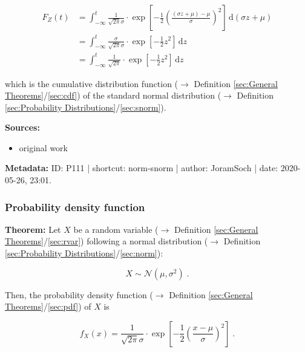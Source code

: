 \documentclass[a4paper,12pt,twoside]{book}
\begin{document}
\begin{equation} \label{eq:norm-snorm-snorm-cdf}
\begin{split}
F_Z(t) &= \int_{-\infty}^{t} \frac{1}{\sqrt{2 \pi} \sigma} \cdot \exp \left[ -\frac{1}{2} \left( \frac{(\sigma z + \mu)-\mu}{\sigma} \right)^2 \right] \, \mathrm{d}(\sigma z + \mu) \\
&= \int_{-\infty}^{t} \frac{\sigma}{\sqrt{2 \pi} \sigma} \cdot \exp \left[ -\frac{1}{2} z^2 \right] \, \mathrm{d}z \\
&= \int_{-\infty}^{t} \frac{1}{\sqrt{2 \pi}} \cdot \exp \left[ -\frac{1}{2} z^2 \right] \, \mathrm{d}z
\end{split}
\end{equation}

which is the cumulative distribution function ($\rightarrow$ Definition \ref{sec:General Theorems}/\ref{sec:cdf}) of the standard normal distribution ($\rightarrow$ Definition \ref{sec:Probability Distributions}/\ref{sec:snorm}).


\vspace{1em}
\textbf{Sources:}
\begin{itemize}
\item original work\end{itemize}


\vspace{1em}
\textbf{Metadata:} ID: P111 | shortcut: norm-snorm | author: JoramSoch | date: 2020-05-26, 23:01.
\vspace{1em}



\subsubsection[\textbf{Probability density function}]{Probability density function} \label{sec:norm-pdf}
\setcounter{equation}{0}

\textbf{Theorem:} Let $X$ be a random variable ($\rightarrow$ Definition \ref{sec:General Theorems}/\ref{sec:rvar}) following a normal distribution ($\rightarrow$ Definition \ref{sec:Probability Distributions}/\ref{sec:norm}):

\begin{equation} \label{eq:norm-pdf-norm}
X \sim \mathcal{N}(\mu, \sigma^2) \; .
\end{equation}

Then, the probability density function ($\rightarrow$ Definition \ref{sec:General Theorems}/\ref{sec:pdf}) of $X$ is

\begin{equation} \label{eq:norm-pdf-norm-pdf}
f_X(x) = \frac{1}{\sqrt{2 \pi} \sigma} \cdot \exp \left[ -\frac{1}{2} \left( \frac{x-\mu}{\sigma} \right)^2 \right] \; .
\end{equation}
\end{document}
